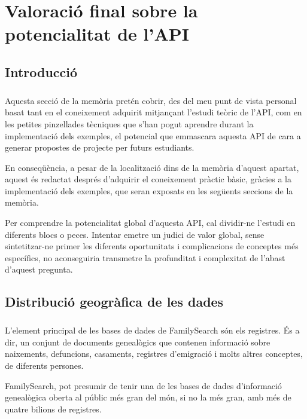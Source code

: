 \chapter{Valoració final sobre la potencialitat de l'API}

\section{Introducció}

    \paragraph{}
    Aquesta secció de la memòria pretén cobrir, des del meu punt de vista personal basat tant en el coneixement adquirit mitjançant l'estudi teòric de l'API, com en les petites pinzellades tècniques que s'han pogut aprendre durant la implementació dels exemples, el potencial que emmascara aquesta API de cara a generar propostes de projecte per futurs estudiants.

    En conseqüència, a pesar de la localització dins de la memòria d'aquest apartat, aquest és redactat després d'adquirir el coneixement pràctic bàsic, gràcies a la implementació dels exemples, que seran exposats en les següents seccions de la memòria.

    Per comprendre la potencialitat global d'aquesta API, cal dividir-ne l'estudi en diferents blocs o peces. Intentar emetre un judici de valor global, sense sintetitzar-ne primer les diferents oportunitats i complicacions de conceptes més específics, no aconseguiria transmetre la profunditat i complexitat de l'abast d'aquest pregunta.

\section{Distribució geogràfica de les dades}

    \paragraph{}
    L'element principal de les bases de dades de FamilySearch són els registres. És a dir, un conjunt de documents genealògics que contenen informació sobre naixements, defuncions, casaments, registres d'emigració i molts altres conceptes, de diferents persones.

    FamilySearch, pot presumir de tenir una de les bases de dades d'informació genealògica oberta al públic més gran del món, si no la més gran, amb més de quatre bilions de registres.

